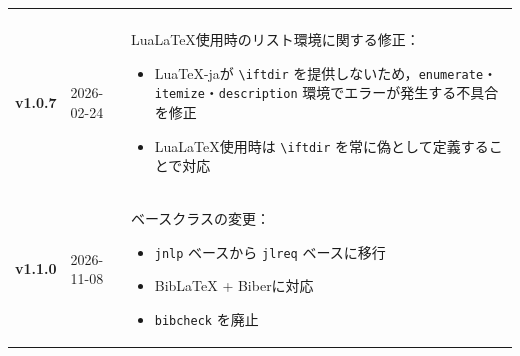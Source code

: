 \documentclass{ltjsarticle}
\newcommand{\pkg}[1]{\texttt{#1}}
\newcommand{\cs}[1]{\texttt{\textbackslash#1}}
\begin{document}
\begin{longtable}{llp{11cm}}
\begin{itemize}[nosep]
    \end{itemize}\\
    \textbf{v1.0.7}&2026-02-24&LuaLaTeX使用時のリスト環境に関する修正：
    \begin{itemize}[nosep]
        \item LuaTeX-jaが \cs{iftdir} を提供しないため，\texttt{enumerate}・\texttt{itemize}・\texttt{description} 環境でエラーが発生する不具合を修正
        \item LuaLaTeX使用時は \cs{iftdir} を常に偽として定義することで対応
    \end{itemize}\\
    \textbf{v1.1.0}&2026-11-08&ベースクラスの変更：
    \begin{itemize}[nosep]
        \item \pkg{jnlp} ベースから \pkg{jlreq} ベースに移行
        \item BibLaTeX + Biberに対応
        \item \pkg{bibcheck} を廃止
    \end{itemize}\\
\end{longtable}
\end{document}
